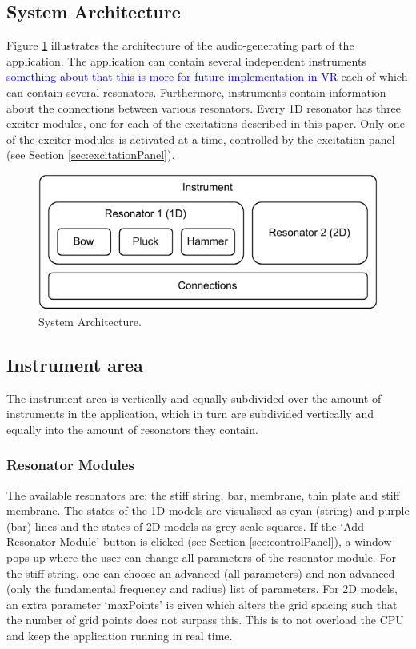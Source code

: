 \documentclass{article}
\def\SWcomment[#1]{\textcolor{blue}{#1}}
\begin{document}
\subsection{System Architecture}
Figure \ref{fig:systemArchitecture} illustrates the architecture of the audio-generating part of the application. The application can contain several independent instruments \SWcomment[something about that this is more for future implementation in VR] each of which can contain several resonators. Furthermore, instruments contain information about the connections between various resonators. Every 1D resonator has three exciter modules, one for each of the excitations described in this paper. Only one of the exciter modules is activated at a time, controlled by the excitation panel (see Section \ref{sec:excitationPanel}). 
\begin{figure}[h]
    \centering
    \includegraphics[width = \columnwidth]{systemArchitectureSMC2022.pdf}
    \caption{System Architecture. }
    \label{fig:systemArchitecture}
\end{figure}

\subsection{Instrument area}
The instrument area is vertically and equally subdivided over the amount of instruments in the application, which in turn are subdivided vertically and equally into the amount of resonators they contain. 

\subsubsection{Resonator Modules}
The available resonators are: the stiff string, bar, membrane, thin plate and stiff membrane. The states of the 1D models are visualised as cyan (string) and purple (bar) lines and the states of 2D models as grey-scale squares. If the `Add Resonator Module' button is clicked (see Section \ref{sec:controlPanel}), a window pops up where the user can change all parameters of the resonator module. For the stiff string, one can choose an advanced (all parameters) and non-advanced (only the fundamental frequency and radius) list of parameters. For 2D models, an extra parameter `maxPoints' is given which alters the grid spacing such that the number of grid points does not surpass this. This is to not overload the CPU and keep the application running in real time.
\end{document}
